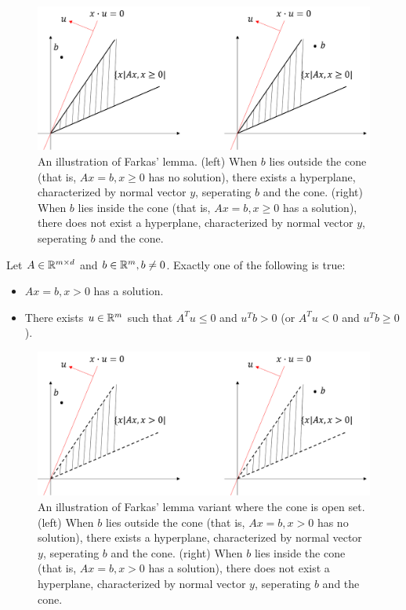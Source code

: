 \begin{refsection}
\begin{figure}[H]
\centering
\includegraphics[width=0.7\linewidth]{figures/optimization/FarkasLemmaDemo}
\caption{An illustration of Farkas' lemma. (left) When $b$ lies outside the cone (that is, $Ax = b, x\geq 0$ has no solution), there exists a hyperplane, characterized by normal vector $y$, seperating $b$ and the cone. (right) When $b$ lies inside the cone (that is, $Ax = b, x\geq 0$ has a solution), there does not exist a hyperplane, characterized by normal vector $y$, seperating $b$ and the cone. }
\label{fig:FarkasLemmaDemo}
\end{figure}

\begin{corollary}\label{ch:convex-analysis:th:FarkaslemmaVariant}
	Let $A\in \mathbb{R}^{m\times d}$ and $b\in \mathbb{R}^m, b\neq 0$. Exactly one of the following is true:
	\begin{itemize}
		\item $Ax = b,x > 0$ has a solution.
		\item There exists $u\in \mathbb{R}^m$ such that $A^Tu \leq 0$ and $u^Tb > 0$ (or $A^Tu < 0$ and $u^Tb \geq 0$).
	\end{itemize}
\end{corollary}


\begin{figure}[H]
	\centering
	\includegraphics[width=0.7\linewidth]{figures/optimization/FarkasLemmaDemo2}
	\caption{An illustration of Farkas' lemma variant where the cone is open set. (left) When $b$ lies outside the cone (that is, $Ax = b, x> 0$ has no solution), there exists a hyperplane, characterized by normal vector $y$, seperating $b$ and the cone. (right) When $b$ lies inside the cone (that is, $Ax = b, x> 0$ has a solution), there does not exist a hyperplane, characterized by normal vector $y$, seperating $b$ and the cone. }
\end{figure}


\end{refsection}
